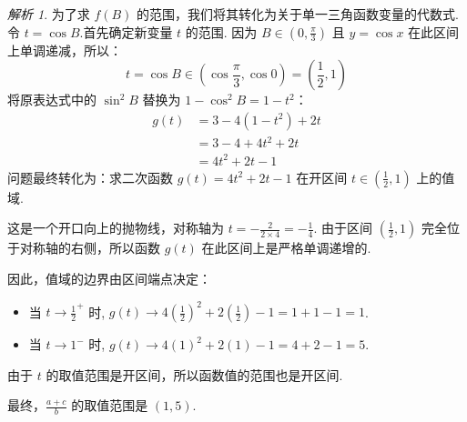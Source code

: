 \documentclass[12pt,a4paper]{ctexbook}
\theoremstyle{definition}
\theoremstyle{remark}
\newtheorem*{solution}{解析}
\begin{document}
\begin{solution}
		为了求 $f(B)$ 的范围，我们将其转化为关于单一三角函数变量的代数式.
		令 $t = \cos B$.首先确定新变量 $t$ 的范围.
		因为 $B \in (0, \frac{\pi}{3})$ 且 $y=\cos x$ 在此区间上单调递减，所以：
		\[
		t = \cos B \in \left(\cos\frac{\pi}{3}, \cos 0\right) = \left(\frac{1}{2}, 1\right)
		\]
		将原表达式中的 $\sin^2 B$ 替换为 $1-\cos^2 B = 1-t^2$：
		\begin{align*}
			g(t) &= 3 - 4(1-t^2) + 2t \\
			&= 3 - 4 + 4t^2 + 2t \\
			&= 4t^2 + 2t - 1
		\end{align*}
		问题最终转化为：求二次函数 $g(t) = 4t^2+2t-1$ 在开区间 $t \in (\frac{1}{2}, 1)$ 上的值域.
		
		这是一个开口向上的抛物线，对称轴为 $t = -\frac{2}{2 \times 4} = -\frac{1}{4}$.
		由于区间 $(\frac{1}{2}, 1)$ 完全位于对称轴的右侧，所以函数 $g(t)$ 在此区间上是严格单调递增的.
		
		因此，值域的边界由区间端点决定：
		\begin{itemize}
			\item 当 $t \to \frac{1}{2}^+$ 时, $g(t) \to 4(\frac{1}{2})^2 + 2(\frac{1}{2}) - 1 = 1+1-1=1$.
			\item 当 $t \to 1^-$ 时, $g(t) \to 4(1)^2 + 2(1) - 1 = 4+2-1=5$.
		\end{itemize}
		由于 $t$ 的取值范围是开区间，所以函数值的范围也是开区间.
		
		最终，$\frac{a+c}{b}$ 的取值范围是 $(1, 5)$.\hfill\qedsymbol
	\end{solution}
	
\end{document}
